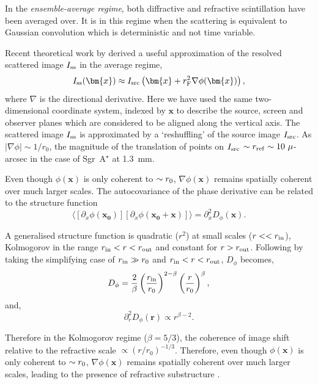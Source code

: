 In the \emph{ensemble-average regime}, both diffractive and refractive scintillation have been averaged over. It is in this regime when the scattering is equivalent to Gaussian convolution which is deterministic and not time variable. 


Recent theoretical work by \citet{Johnson_2015a} derived a useful approximation of the resolved scattered image $I_{\rm ss}$ in the average regime,
\begin{equation}\label{eq:scatterbrane}
I_{\rm ss}(\bm{x}) \approx I_{\rm src}\left(\bm{x} + r_{\rm F}^2 \nabla \phi(\bm{x})\right),
\end{equation}
where $\nabla$ is the directional derivative. Here we have used the same two-dimensional coordinate system, indexed by $\bm{x}$ to describe the source, screen and observer planes which are considered to be aligned along the vertical axis. The scattered image $I_{\rm ss}$ is approximated by a `reshuffling' of the source image $I_{\rm src}$. As $|\nabla\phi| \sim 1/r_0$, the magnitude of the translation of points on $I_{\rm src}$ $\sim r_{\rm ref} \sim 10\ \mu$-arcsec in the case of Sgr~A$^\star$ at 1.3~mm. 

Even though $\phi(\bm{x})$ is only coherent to $\sim r_{\rm 0}$, $\nabla \phi(\bm{x})$ remains spatially coherent over much larger scales. The autocovariance of the phase derivative can be related to the structure function \citep*{Johnson_2015a}
\begin{equation} 
\langle [ \partial_x \phi(\bm{x_0})] [ \partial_x \phi(\bm{x_0}+\bm{x})] \rangle = \partial_x^2 D_\phi(\bm{x}).
\end{equation}


A generalised structure function \citep{Tatarskii_1971, Narayan_1989} is quadratic ($r^2$) at small scales ($r<< r_{\rm in}$), Kolmogorov in the range $r_{\rm in}<r<r_{\rm out}$ and constant for $r>r_{\rm out}$. Following \citep{Johnson_2013} by taking the simplifying case of $r_{\rm in} \gg r_0$ and $r_{\rm in}<r<r_{\rm out}$, $D_\phi$ becomes,
\begin{equation}
D_\phi = \frac{2}{\beta}\left( \frac{r_{\rm in}}{r_0}\right)^{2-\beta} \left( \frac{r}{r_0}\right)^\beta, 
\end{equation}
and, 
\begin{equation}
 \partial_r^2 D_\phi(\bm{r}) \propto r^{\beta-2}.
\end{equation}

Therefore in the Kolmogorov regime ($\beta = 5/3$), the coherence of image shift relative to the refractive scale $\propto (r/r_0)^{-1/3}$. Therefore, even though $\phi(\bm{x})$ is only coherent to $\sim r_{\rm 0}$, $\nabla \phi(\bm{x})$ remains spatially coherent over much larger scales, leading to the presence of refractive substructure \citep*{Johnson_2015a}.

